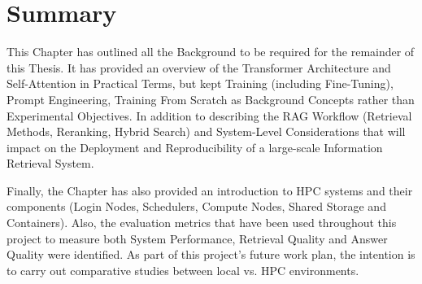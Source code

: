 \section{Summary}

This Chapter has outlined all the Background to be required for the remainder of this Thesis. It has provided an overview of the Transformer Architecture and Self-Attention in Practical Terms, but kept Training (including Fine-Tuning), Prompt Engineering, Training From Scratch as Background Concepts rather than Experimental Objectives. In addition to describing the \ac{RAG} Workflow (Retrieval Methods, Reranking, Hybrid Search) and System-Level Considerations that will impact on the Deployment and Reproducibility of a large-scale Information Retrieval System.

Finally, the Chapter has also provided an introduction to \ac{HPC} systems and their components (Login Nodes, Schedulers, Compute Nodes, Shared Storage and Containers). Also, the evaluation metrics that have been used throughout this project to measure both System Performance, Retrieval Quality and Answer Quality were identified. As part of this project’s future work plan, the intention is to carry out comparative studies between local vs. \ac{HPC} environments.